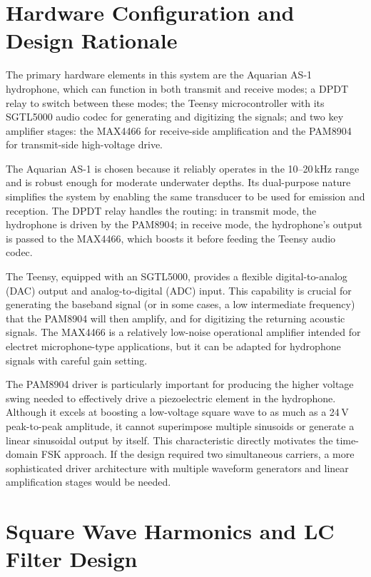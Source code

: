 \section{Hardware Configuration and Design Rationale}

The primary hardware elements in this system are the Aquarian AS-1 hydrophone, which can function in both transmit and receive modes; a DPDT relay to switch between these modes; the Teensy microcontroller with its SGTL5000 audio codec for generating and digitizing the signals; and two key amplifier stages: the MAX4466 for receive-side amplification and the PAM8904 for transmit-side high-voltage drive. 

The Aquarian AS-1 is chosen because it reliably operates in the 10--20\,kHz range and is robust enough for moderate underwater depths. Its dual-purpose nature simplifies the system by enabling the same transducer to be used for emission and reception. The DPDT relay handles the routing: in transmit mode, the hydrophone is driven by the PAM8904; in receive mode, the hydrophone's output is passed to the MAX4466, which boosts it before feeding the Teensy audio codec. 

The Teensy, equipped with an SGTL5000, provides a flexible digital-to-analog (DAC) output and analog-to-digital (ADC) input. This capability is crucial for generating the baseband signal (or in some cases, a low intermediate frequency) that the PAM8904 will then amplify, and for digitizing the returning acoustic signals. The MAX4466 is a relatively low-noise operational amplifier intended for electret microphone-type applications, but it can be adapted for hydrophone signals with careful gain setting. 

The PAM8904 driver is particularly important for producing the higher voltage swing needed to effectively drive a piezoelectric element in the hydrophone. Although it excels at boosting a low-voltage square wave to as much as a 24\,V peak-to-peak amplitude, it cannot superimpose multiple sinusoids or generate a linear sinusoidal output by itself. This characteristic directly motivates the time-domain FSK approach. If the design required two simultaneous carriers, a more sophisticated driver architecture with multiple waveform generators and linear amplification stages would be needed.

\section{Square Wave Harmonics and LC Filter Design}

